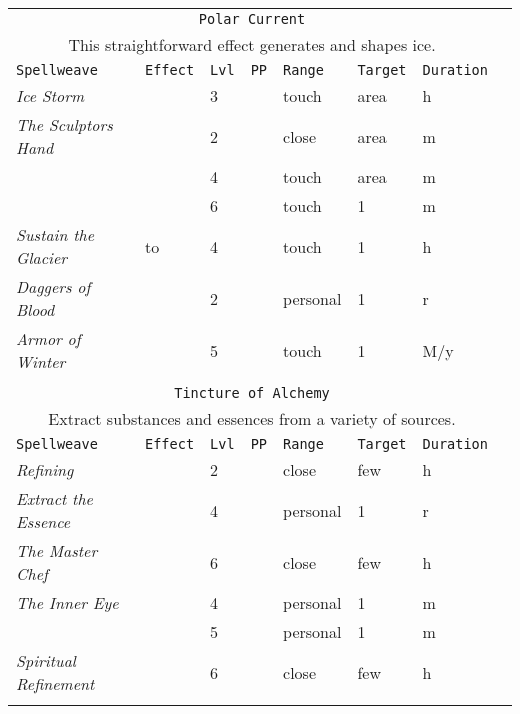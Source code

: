 \documentclass[10pt,a4paper]{article}
\begin{document}
\begin{table}[htbp!]
\begin{tabular}{llllllll}
   
   \multicolumn{7}{c}{\texttt{Polar Current}}\\
  \multicolumn{7}{c}{This straightforward effect generates and shapes ice.}\\
    \hline
 \texttt{Spellweave} & \texttt{Effect} & \texttt{Lvl} & \texttt{PP} & \texttt{Range} & \texttt{Target} & \texttt{Duration} \\
    \hline
    \multirow{1}{*}{\textit{Ice Storm}} &  & 3 && touch & area & h\\
    \hline
    \multirow{1}{*}{\textit{The Sculptors Hand}} &  & 2 && close & area & m\\
    									     &  & 4 && touch & area & m\\
    									     &  & 6 && touch & 1 & m\\
    \hline
    \multirow{1}{*}{\textit{Sustain the Glacier}}& to & 4 && touch & 1 & h\\
    \hline
    \multirow{1}{*}{\textit{Daggers of Blood}}&  & 2 && personal & 1 & r\\
    \hline
    \multirow{1}{*}{\textit{Armor of Winter}}&  & 5 && touch & 1 & M/y\\
	&&&&&&\\  
    
   
   \multicolumn{7}{c}{\texttt{Tincture of Alchemy}}\\
  \multicolumn{7}{c}{Extract substances and essences from a variety of sources.}\\
    \hline
 \texttt{Spellweave} & \texttt{Effect} & \texttt{Lvl} & \texttt{PP} & \texttt{Range} & \texttt{Target} & \texttt{Duration} \\
    \hline
    \multirow{1}{*}{\textit{Refining}}&  & 2 && close & few & h\\
    \hline
    \multirow{1}{*}{\textit{Extract the Essence}}& & 4 && personal & 1 & r\\
    \hline
    \multirow{1}{*}{\textit{The Master Chef}}&  & 6 && close & few & h\\
    \hline
    \multirow{1}{*}{\textit{The Inner Eye}}&  & 4 && personal & 1 & m\\
    											 &  & 5 && personal & 1 & m\\
	\multirow{1}{*}{\textit{Spiritual Refinement}}&  & 6 && close & few & h\\    											 
	&&&&&&\\
	
		
\end{tabular}
\end{table} 
\end{document}
